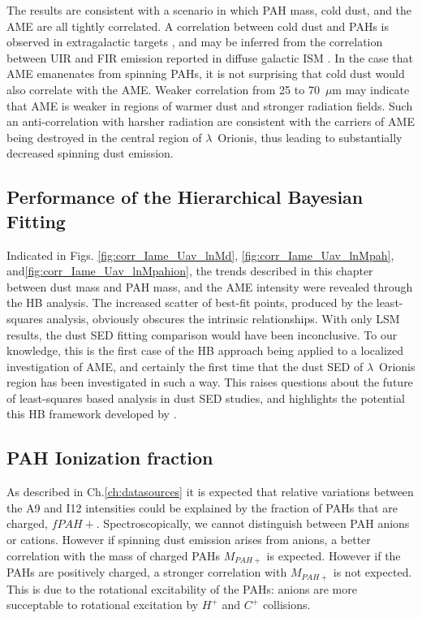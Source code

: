         The results are consistent with a scenario in which PAH mass, cold dust, and the AME are all tightly correlated. A correlation between cold dust and PAHs is observed in extragalactic targets \citep{haas02}, and may be inferred from the correlation between UIR and FIR emission reported in diffuse galactic ISM \citep{onaka96}. In the case that AME emanenates from spinning PAHs, it is not surprising that cold dust would also correlate with the AME. Weaker correlation from 25 to 70~$\mu$m may indicate that AME is weaker in regions of warmer dust and stronger radiation fields. Such an anti-correlation with harsher radiation are consistent with the carriers of AME being destroyed in the central region of $\lambda$~Orionis, thus leading to substantially decreased spinning dust emission.

      \subsection{Performance of the Hierarchical Bayesian Fitting}

      Indicated in Figs. \ref{fig:corr_Iame_Uav_lnMd}, \ref{fig:corr_Iame_Uav_lnMpah}, and\ref{fig:corr_Iame_Uav_lnMpahion}, the trends described in this chapter between dust mass and PAH mass, and the AME intensity were revealed through the HB analysis. The increased scatter of best-fit points, produced by the least-squares analysis, obviously obscures the intrinsic relationships. With only LSM results, the dust SED fitting comparison would have been inconclusive. To our knowledge, this is the first case of the HB approach being applied to a localized investigation of AME, and certainly the first time that the dust SED of $\lambda$~Orionis region has been investigated in such a way. This raises questions about the future of least-squares based analysis in dust SED studies, and highlights the potential this HB framework developed by \cite{galliano18}.
      
      \subsection{PAH Ionization fraction}
          As described in Ch.\ref{ch:datasources} it is expected that relative variations between the A9 and I12 intensities could be explained by the fraction of PAHs that are charged, $fPAH+$. Spectroscopically, we cannot distinguish between PAH anions or cations. However if spinning dust emission arises from anions, a better correlation with the mass of charged PAHs $M_{PAH+}$ is expected. However if the PAHs are positively charged, a stronger correlation with $M_{PAH+}$ is not expected. This is due to the rotational excitability of the PAHs: anions are more succeptable to rotational excitation by $H^{+}$ and $C^{+}$ collisions\citep{ali-haimoud10}.

